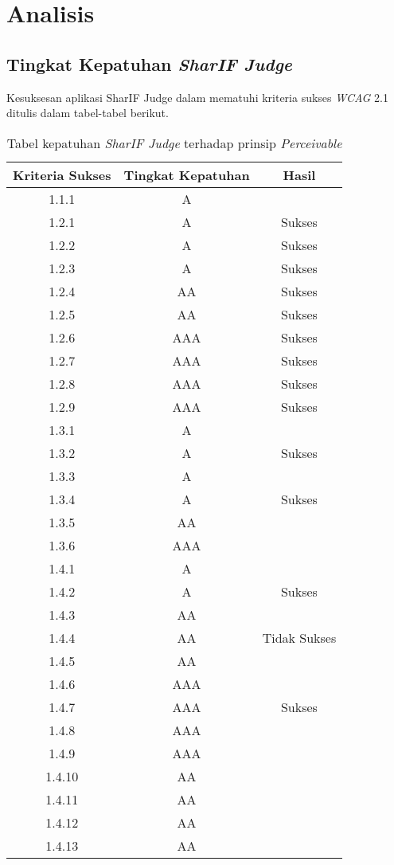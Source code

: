 \chapter{Analisis}
\label{chap:analisis}

\section{Tingkat Kepatuhan \textit{SharIF Judge}}
\label{sec:kepatuhan_sharif_judge_terhadap_wcag_2.1}
Kesuksesan aplikasi SharIF Judge dalam mematuhi kriteria sukses \textit{WCAG} 2.1 ditulis dalam tabel-tabel berikut.

\begin{table}[H]
	\centering
	\caption{Tabel kepatuhan \textit{SharIF Judge} terhadap prinsip \textit{Perceivable}}
	\label{tab:kepatuhan_sharif_judge_perceivable}
	\begin{tabular}{|c|c|c|}
		\hline
		Kriteria Sukses & Tingkat Kepatuhan & Hasil \\
		\hline
		1.1.1 & A &  \\
		1.2.1 & A & Sukses \\
		1.2.2 & A & Sukses \\
		1.2.3 & A & Sukses \\
		1.2.4 & AA & Sukses \\
		1.2.5 & AA & Sukses \\
		1.2.6 & AAA & Sukses \\
		1.2.7 & AAA & Sukses \\
		1.2.8 & AAA & Sukses \\
		1.2.9 & AAA & Sukses \\
		1.3.1 & A &  \\
		1.3.2 & A & Sukses \\
		1.3.3 & A &  \\
		1.3.4 & A & Sukses \\
		1.3.5 & AA &  \\
		1.3.6 & AAA &  \\
		1.4.1 & A & \\
		1.4.2 & A & Sukses \\
		1.4.3 & AA & \\
		1.4.4 & AA & Tidak Sukses \\
		1.4.5 & AA & \\
		1.4.6 & AAA & \\
		1.4.7 & AAA & Sukses \\
		1.4.8 & AAA & \\
		1.4.9 & AAA & \\
		1.4.10 & AA & \\
		1.4.11 & AA & \\
		1.4.12 & AA & \\
		1.4.13 & AA & \\
		\hline
	\end{tabular}
\end{table}

